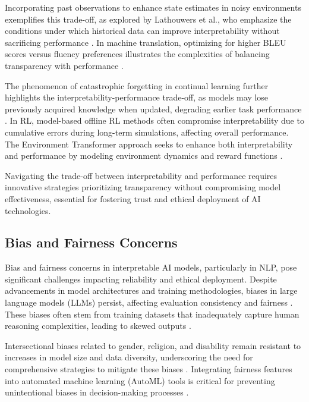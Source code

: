 Incorporating past observations to enhance state estimates in noisy environments exemplifies this trade-off, as explored by Lathouwers et al., who emphasize the conditions under which historical data can improve interpretability without sacrificing performance \cite{lathouwers2017memorypaysdiscordhidden}. In machine translation, optimizing for higher BLEU scores versus fluency preferences illustrates the complexities of balancing transparency with performance \cite{bogoychev2020domaintranslationesenoisesynthetic}.

The phenomenon of catastrophic forgetting in continual learning further highlights the interpretability-performance trade-off, as models may lose previously acquired knowledge when updated, degrading earlier task performance \cite{chitale2023taskarithmeticloracontinual}. In RL, model-based offline RL methods often compromise interpretability due to cumulative errors during long-term simulations, affecting overall performance. The Environment Transformer approach seeks to enhance both interpretability and performance by modeling environment dynamics and reward functions \cite{wang2023environmenttransformerpolicyoptimization}.

Navigating the trade-off between interpretability and performance requires innovative strategies prioritizing transparency without compromising model effectiveness, essential for fostering trust and ethical deployment of AI technologies.

\subsection{Bias and Fairness Concerns} \label{subsec:Bias and Fairness Concerns}

Bias and fairness concerns in interpretable AI models, particularly in NLP, pose significant challenges impacting reliability and ethical deployment. Despite advancements in model architectures and training methodologies, biases in large language models (LLMs) persist, affecting evaluation consistency and fairness \cite{JudgingLLM1}. These biases often stem from training datasets that inadequately capture human reasoning complexities, leading to skewed outputs \cite{GPT-4Techn0}.

Intersectional biases related to gender, religion, and disability remain resistant to increases in model size and data diversity, underscoring the need for comprehensive strategies to mitigate these biases \cite{magee2021intersectionalbiascausallanguage}. Integrating fairness features into automated machine learning (AutoML) tools is critical for preventing unintentional biases in decision-making processes \cite{narayanan2023democratizecareneedfairness}.

